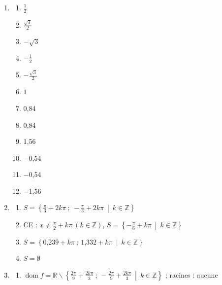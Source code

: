 \documentclass[a4paper,fontsize=13pt]{scrreprt}
\theoremstyle{plain}
\theoremstyle{definition}
\newcommand{\zz}{\mathbb{Z}}
\newcommand{\rr}{\mathbb{R}}
\DeclareMathOperator{\dom}{dom}
\newenvironment{benumerate}[1][0pt]{\begin{enumerate}\renewcommand{\makelabel}[1]{\textbf{##1}}\setlength{\itemsep}{#1}}{\end{enumerate}}
\renewcommand{\d}{\displaystyle}
\begin{document}
\begin{benumerate}

\item \begin{multicols}{3}
\begin{benumerate}
\item $\frac{1}{2}$
\item $\frac{\sqrt{3}}{2}$
\item $-\sqrt{3}$
\item $-\frac{1}{2}$
\item $-\frac{\sqrt{3}}{2}$
\item $1$
\item 0,84
\item 0,84
\item 1,56
\item $-$0,54
\item $-$0,54
\item $-$1,56
\end{benumerate}
\end{multicols}

\item 
\begin{enumerate}
\item $\d S = \left\{\frac{\pi}{3}+2k\pi ~ ; ~ -\frac{\pi}{3}+2k\pi ~ \middle| ~ k\in \zz \right\}$
\item CE : $\d x \neq \frac{\pi}{2}+k\pi~(k\in\zz)$, $\d S = \left\{ -\frac{\pi}{6}+k\pi ~ \middle| ~ k \in \zz \right\}$
\item $\d S = \left\{ \text{0,239}+k\pi ~ ; ~ \text{1,332}+k\pi ~\middle|~k \in \zz \right\}$
\item $\d S = \emptyset$
\end{enumerate}

\item
\begin{benumerate}
\item $\dom f=\rr\backslash\left\{\frac{2\pi}{9}+\frac{2k\pi}{3}~;~-\frac{2\pi}{9}+\frac{2k\pi}{3}~\middle|~k\in\zz\right\}$ ; racines : aucune
\end{benumerate}


\end{benumerate}
\end{document}
